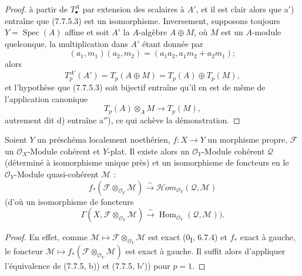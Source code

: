 \begin{proof}
à partir de $T_\bullet^A$ par extension des scalaires à $A'$, et il est clair
alors que a$'$) entraîne que (7.7.5.3) est un isomorphisme. Inversement, supposons
toujours $Y=\operatorname{Spec}(A)$ affine et soit $A'$ la $A$-algèbre
$A\oplus M$, où $M$ est un $A$-module quelconque, la multiplication dans $A'$
étant donnée par
\[
  (a_1,m_1)(a_2,m_2)
  =
  (a_1a_2,a_1m_2+a_2m_1);
\]
alors
\[
  T_p^{A'}(A')
  =
  T_p(A\oplus M)
  =
  T_p(A)\oplus T_p(M),
\]
et l'hypothèse que (7.7.5.3) soit bijectif entraîne qu'il en est de même de
l'application canonique
\[
  T_p(A)\otimes_A M\longrightarrow T_p(M),
\]
autrement dit d) entraîne a$''$), ce qui achève la démonstration.
\end{proof}

\begin{theorem}[7.7.6]
Soient $Y$ un préschéma localement noethérien, $f:X\to Y$ un morphisme propre,
$\mathscr F$ un $\mathscr O_X$-Module cohérent et $Y$-plat. Il existe alors un
$\mathscr O_Y$-Module cohérent $\mathscr Q$ (déterminé à isomorphisme unique près)
et un isomorphisme de foncteurs en le $\mathscr O_Y$-Module quasi-cohérent
$\mathscr M$ :
\[
  f_*(\mathscr F\otimes_{\mathscr O_Y}\mathscr M)
  \xrightarrow{\sim}
  \mathscr{H}\!om_{\mathscr O_Y}(\mathscr Q,\mathscr M)
  \tag{7.7.6.1}\label{III.7.7.6.1.fr}
\]
(d'où un isomorphisme de foncteurs
\[
  \Gamma(X,\mathscr F\otimes_{\mathscr O_Y}\mathscr M)
  \xrightarrow{\sim}
  \operatorname{Hom}_{\mathscr O_Y}(\mathscr Q,\mathscr M)).
  \tag{7.7.6.2}\label{III.7.7.6.2.fr}
\]
\end{theorem}

\begin{proof}
En effet, comme $\mathscr M\mapsto\mathscr F\otimes_{\mathscr O_Y}\mathscr M$ est
exact (0\textsubscript{I}, 6.7.4) et $f_*$ exact à gauche, le foncteur
$\mathscr M\mapsto f_*(\mathscr F\otimes_{\mathscr O_Y}\mathscr M)$ est exact à
gauche. Il suffit alors d'appliquer l'équivalence de (7.7.5, b)) et (7.7.5,
b$'$)) pour $p=1$.
\end{proof}

